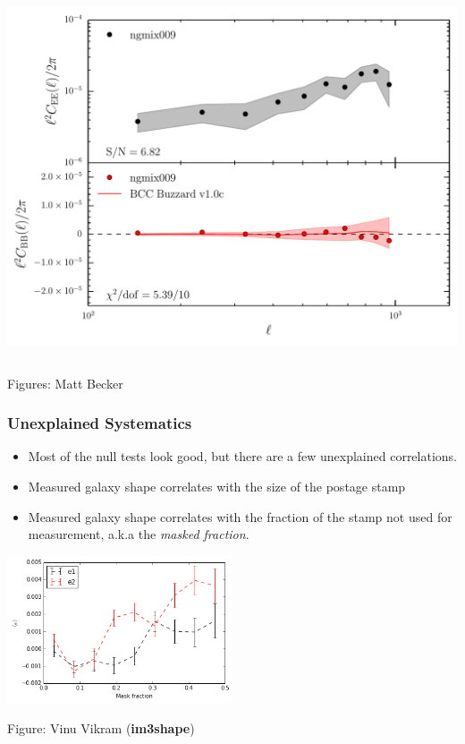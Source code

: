\documentclass{beamer}
\newcommand{\imshape}{{\bf im3shape}}
\begin{document}
{\begin{columns}
        \begin{column}{0.5\textwidth}
            \begin{center}
                \includegraphics[width=1.05\textwidth]{ngmix009_b.pdf}
            \end{center}
        \end{column}

    \end{columns}
    {\tiny Figures: Matt Becker}
}

\frame
{
    \frametitle{Unexplained Systematics}

    \begin{itemize}

        \item Most of the null tests look good, but there are a few unexplained
            correlations.

        \item Measured galaxy shape correlates with the size of the postage stamp
    
         \item Measured galaxy shape correlates with the fraction of the stamp
             not used for measurement, a.k.a the {\em masked fraction}.

     \end{itemize}

    \begin{center}
        \includegraphics[width=0.5\textwidth]{im3shape-v-vs-mask-frac.png}
    \end{center}

     {\tiny Figure: Vinu Vikram (\imshape)}
}
\end{document}
